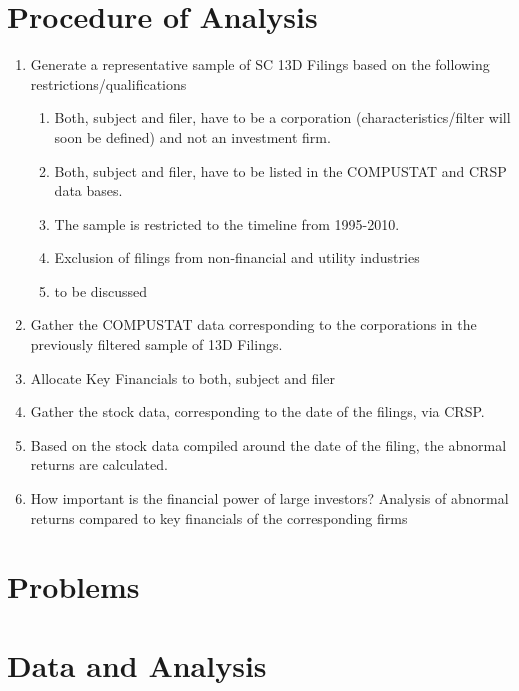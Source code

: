 \documentclass[11pt,openright]{article}
\begin{document}
\section{Procedure of Analysis}

\begin{enumerate}
\item Generate a representative sample of SC 13D Filings based on the following restrictions/qualifications

	\begin{enumerate}
	\item Both, subject and filer, have to be a corporation (characteristics/filter will soon be defined) and not an investment firm.
  \item Both, subject and filer, have to be listed in the COMPUSTAT and CRSP data bases.
	\item The sample is restricted to the timeline from 1995-2010.
	\item Exclusion of filings from non-financial and utility industries \citep{Brigida2012}
	\item to be discussed
	\end{enumerate}

\item Gather the COMPUSTAT data corresponding to the corporations in the previously filtered sample of 13D Filings.
\item Allocate Key Financials to both, subject and filer
\item Gather the stock data, corresponding to the date of the filings, via CRSP.
\item Based on the stock data compiled around the date of the filing, the abnormal returns are calculated. 
\item How important is the financial power of large investors? Analysis of abnormal returns compared to key financials of the corresponding firms

\end{enumerate}


\section{Problems}






\section{Data and Analysis}

\printbibliography
\end{document}
